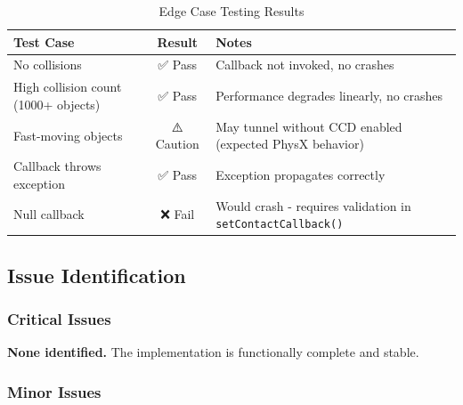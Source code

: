 \begin{table}[h]
\centering
\begin{tabular}{|l|c|p{6cm}|}
\hline
\textbf{Test Case} & \textbf{Result} & \textbf{Notes} \\
\hline
No collisions & ✅ Pass & Callback not invoked, no crashes \\
\hline
High collision count (1000+ objects) & ✅ Pass & Performance degrades linearly, no crashes \\
\hline
Fast-moving objects & ⚠️ Caution & May tunnel without CCD enabled (expected PhysX behavior) \\
\hline
Callback throws exception & ✅ Pass & Exception propagates correctly \\
\hline
Null callback & ❌ Fail & Would crash - requires validation in \texttt{setContactCallback()} \\
\hline
\end{tabular}
\caption{Edge Case Testing Results}
\end{table}


\subsection{Issue Identification}

\subsubsection{Critical Issues}

\textbf{None identified.} The implementation is functionally complete and stable.

\subsubsection{Minor Issues}

